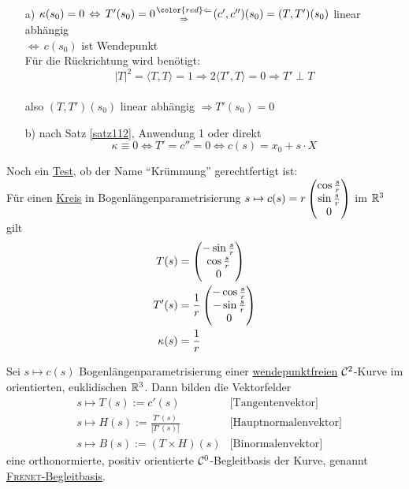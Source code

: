 \begin{beweis} \(\)
 \begin{enumerate}
  \item[a)] \(\kappa(s_0) = 0 \, \Leftrightarrow \, T'(s_0) = 0 {{\color{red}\Leftarrow} \atop \Rightarrow} (c', c'')(s_0) = (T, T')(s_0)\) linear abhängig \\
  \(\Leftrightarrow \, c(s_0)\) ist Wendepunkt \\
  Für die {\color{red}Rückrichtung} wird benötigt: \\
   \[|T|^2 = \langle T,T\rangle = 1 \Rightarrow 2 \langle T',T\rangle = 0 \Rightarrow T' \perp T\] \\
   also \((T,T')(s_0)\) linear abhängig \(\Rightarrow T'(s_0)=0\)
   \item[b)] nach Satz \ref{satz112}, Anwendung 1 oder direkt
   \[
    \kappa \equiv 0 \Leftrightarrow T'= c'' = 0 \Leftrightarrow c(s) = x_0 + s \cdot X
   \]
 \end{enumerate}
\end{beweis}
Noch ein \uline{Test}, ob der Name "`Krümmung"' gerechtfertigt ist: \\
Für einen \uline{Kreis} in Bogenlängenparametrisierung \(s \mapsto c(s) = r \begin{pmatrix} \cos \frac sr \\ \sin \frac sr \\ 0 \end{pmatrix} \) im \(\mathbb{R}^3\) gilt
\begin{align*}
 T(s) &= \begin{pmatrix} -\sin \frac sr \\ \cos \frac sr \\ 0 \end{pmatrix}  \\
 T'(s) &= \frac 1r \begin{pmatrix} -\cos \frac sr \\ -\sin \frac sr \\ 0 \end{pmatrix}  \\
 \kappa(s) &= \frac 1r
\end{align*}

\begin{satz}\label{satz132}
 Sei \(s \mapsto c(s)\) Bogenlängenparametrisierung einer \uline{wendepunktfreien} \(\mathcal{C}^2\)-Kurve im orientierten, euklidischen \(\mathbb{R}^3\). Dann bilden die Vektorfelder
 \begin{align*}
  &s \mapsto T(s) := c'(s) & \text{[Tangentenvektor]} \\
  &s \mapsto H(s) := \frac{T'(s)}{|T'(s)|} & \text{[Hauptnormalenvektor]} \\
  &s \mapsto B(s) := (T \times H)(s) & \text{[Binormalenvektor]}
 \end{align*}
 eine orthonormierte, positiv orientierte \(\mathcal{C}^0\)-Begleitbasis der Kurve, genannt \uline{\textsc{Frenet}-Begleitbasis}.
\end{satz}

